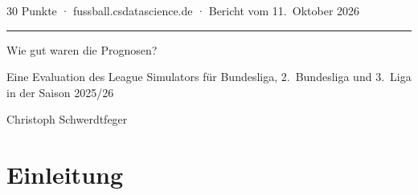 \documentclass[11pt,a4paper,parskip=half,numbers=noenddot]{scrartcl}
\begin{document}
\begin{flushleft}
  {\sffamily\small\color{ink3} 30 Punkte · fussball.csdatascience.de · Bericht vom 11.~Oktober 2026\par}
  \vspace{4pt}
  {\color{akzent}\rule{40pt}{2pt}\par}
  \vspace{10pt}
  {\fontsize{24}{28}\selectfont Wie gut waren die Prognosen?\par}
  \vspace{6pt}
  {\large\color{ink2} Eine Evaluation des League Simulators für Bundesliga,
  2.~Bundesliga und 3.~Liga in der Saison 2025/26\par}
  \vspace{8pt}
  {\sffamily\small Christoph Schwerdtfeger\par}
\end{flushleft}

\begin{abstract}
\noindent
Der League Simulator schätzt mit ELO-Werten, einem Poisson-Tormodell und
\num{10000} Monte-Carlo-Durchläufen, mit welcher Wahrscheinlichkeit jede
Mannschaft auf jedem Tabellenplatz landet. Wir rechnen diese Prognose für die
Saison 2025/26 vor jedem Spieltag nach, für drei Ligen also 106-mal, und
messen sie an den Endtabellen. Dazu dienen der Ranked Probability Score, der
Brier-Score, der logarithmische Score, Brier-Scores für Meisterschaft, Auf-
und Abstieg sowie Kalibrierungsdiagramme. Als naive Vergleichsprognosen
dienen die jeweils aktuelle Tabelle und vor Saisonbeginn die Tabelle der
Vorsaison. Über die Saison gemittelt ist das Modell in allen drei Ligen klar
besser als die aktuelle Tabelle. Der Ranked Probability Score sinkt um
35 bis 44~Prozent, und an 104 der 106 Spieltage liegt das Modell vorn. Als
reine Rangfolge ist der Vorsprung kleiner. In der zweiten Saisonhälfte der
3.~Liga ist die aktuelle Tabelle sogar gleichauf. Vor Saisonbeginn schlägt
das Modell die Vorsaisontabelle in jeder Liga deutlich. In der 2.~Bundesliga
und der 3.~Liga ist es dann aber kaum besser als eine Gleichverteilung,
nach dem logarithmischen Score sogar schlechter. Ursachen sind die
Überschätzung von Absteigern und eine zu große Schärfe bei mittleren und
hohen Wahrscheinlichkeiten. Die 1X2-Prognosen der Einzelspiele sind
brauchbar, unterschätzen aber den Heimvorteil der Saison 2025/26 um rund fünf
Prozentpunkte.
\end{abstract}

\section{Einleitung}
\end{document}
